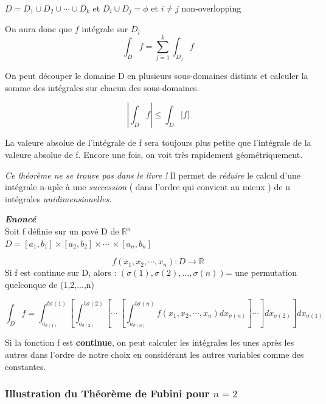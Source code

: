 \begin{myprop}
$D= D_1 \cup D_2 \cup \cdots \cup D_k$ et $D_i \cup D_j = \phi$ et $i\neq j$ non-overlopping

On aura donc que $f$ intégrale sur $D_i$
\[\int_D f=\sum_{j=1}^k \int_{D_j} f\]

On peut découper le domaine D en plusieurs sous-domaines distints et calculer la somme des intégrales sur chacun des sous-domaines.
\end{myprop}

\begin{myprop}
\[\left|\int_D f \right| \le \int_D|f|\]

La valeure absolue de l'intégrale de f sera toujours plus petite que l'intégrale de la valeure absolue de f. Encore une fois, on voit très rapidement géométriquement.
\end{myprop}

\begin{myprop}
\textit{Ce théorème ne se trouve pas dans le livre !}
Il permet de \emph{réduire} le calcul d'une intégrale n-uple à une \emph{succession} ( dans l'ordre qui convient au mieux ) de n intégrales \emph{unidimensionelles}.

\textit{\textbf{Enoncé}} \\Soit f définie sur un pavé D de $\mathbb{R}^n$\\
$D=[a_1,b_1]\times[a_2,b_2]\times \cdots\ \times[a_n,b_n]$


\[f(x_1,x_2,\cdots,x_n) : D\to\mathbb{R}\]
Si f est continue sur D, alors : $(\sigma(1),\sigma(2),...,\sigma(n)) $= une permutation quelconque de (1,2,...,n)

$$
\int_D f= \int_{a_{\sigma(1)}}^{b{\sigma(1)}}
\left[
\int_{a_{\sigma(2)}}^{b{\sigma(2)}}
\left[ \cdots\ \left[
\int_{a_{\sigma(n)}}^{b{\sigma(n)}}
f(x_1,x_2,\cdots,x_n )dx_{\sigma(n)}
\right]\cdots\right]
dx_{\sigma(2)} \right] dx_{\sigma(1)}
$$

Si la fonction f est \textbf{continue}, on peut calculer les intégrales les unes après les autres dans l'ordre de notre choix en considérant les autres variables comme des constantes.
\end{myprop}




\subsubsection{Illustration du Théorème de Fubini pour $n=2$}




